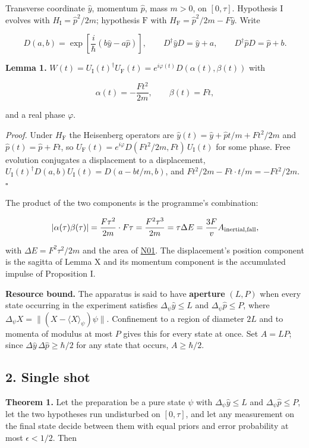 \documentclass[11pt,a4paper]{article}
\begin{document}
Transverse coordinate \(\hat y\), momentum \(\hat p\), mass \(m>0\), on
\([0,\tau]\). Hypothesis \(\mathrm I\) evolves with
\(H_{\mathrm I}=\hat p^2/2m\); hypothesis \(\mathrm F\) with
\(H_{\mathrm F}=\hat p^2/2m-F\hat y\). Write

\[D(a,b)=\exp\!\left[\frac{i}{\hbar}\left(b\hat y-a\hat p\right)\right],
\qquad D^\dagger\hat yD=\hat y+a,\qquad D^\dagger\hat pD=\hat p+b .\]

\textbf{Lemma 1.}
\(W(t)=U_{\mathrm I}(t)^\dagger U_{\mathrm F}(t) =e^{i\varphi(t)}D\!\left(\alpha(t),\beta(t)\right)\)
with

\[\alpha(t)=-\frac{Ft^2}{2m},\qquad \beta(t)=Ft,\]

and a real phase \(\varphi\).

\emph{Proof.} Under \(H_{\mathrm F}\) the Heisenberg operators are
\(\hat y(t)=\hat y+\hat pt/m+Ft^2/2m\) and \(\hat p(t)=\hat p+Ft\), so
\(U_{\mathrm F}(t)=e^{i\varphi}D(Ft^2/2m,Ft)\,U_{\mathrm I}(t)\) for
some phase. Free evolution conjugates a displacement to a displacement,
\(U_{\mathrm I}(t)^\dagger D(a,b)U_{\mathrm I}(t)=D(a-bt/m,b)\), and
\(Ft^2/2m-Ft\cdot t/m=-Ft^2/2m\). \(\square\)

The product of the two components is the programme's combination:

\[|\alpha(\tau)\beta(\tau)|=\frac{F\tau^2}{2m}\cdot F\tau
=\frac{F^2\tau^3}{2m}=\tau\Delta E=\frac{3F}{v}A_{\rm inertial,fall},\]

with \(\Delta E=F^2\tau^2/2m\) and the area of
\href{newton-insertion-action.md}{N01}. The displacement's position
component is the sagitta of Lemma X and its momentum component is the
accumulated impulse of Proposition I.

\textbf{Resource bound.} The apparatus is said to have \textbf{aperture}
\((L,P)\) when every state occurring in the experiment satisfies
\(\Delta_\psi\hat y\le L\) and \(\Delta_\psi\hat p\le P\), where
\(\Delta_\psi X=\|(X-\langle X\rangle_\psi)\psi\|\). Confinement to a
region of diameter \(2L\) and to momenta of modulus at most \(P\) gives
this for every state at once. Set \(A=LP\); since
\(\Delta\hat y\,\Delta\hat p\ge\hbar/2\) for any state that occurs,
\(A\ge\hbar/2\).

\hypertarget{single-shot}{%
\subsection{2. Single shot}\label{single-shot}}

\textbf{Theorem 1.} Let the preparation be a pure state \(\psi\) with
\(\Delta_\psi\hat y\le L\) and \(\Delta_\psi\hat p\le P\), let the two
hypotheses run undisturbed on \([0,\tau]\), and let any measurement on
the final state decide between them with equal priors and error
probability at most \(\epsilon<1/2\). Then
\end{document}

